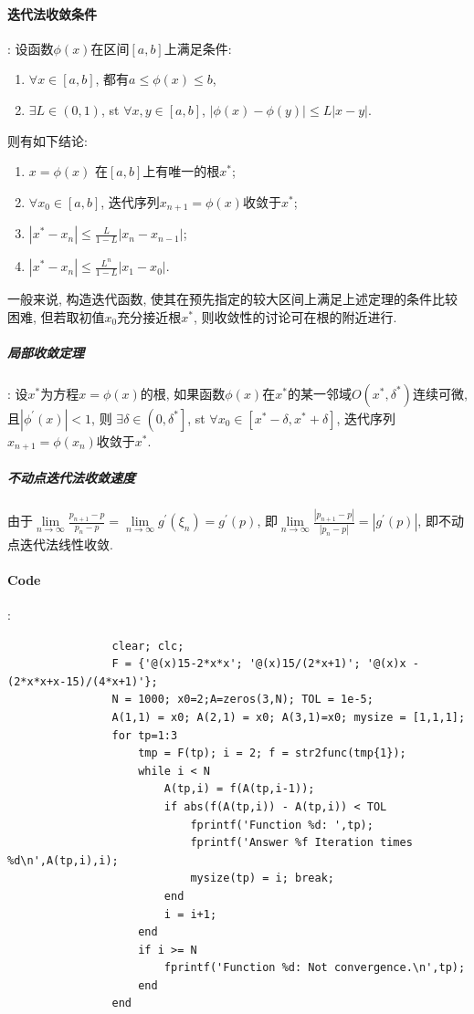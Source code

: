 \documentclass{article}
\begin{document}
\begin{CJK*}{UTF8}{song}
			\paragraph{迭代法收敛条件}:
				设函数$\phi \left( x\right)$在区间$\left[a,b\right]$上满足条件:
				\begin{enumerate}
					\item $\forall x \in \left[a,b\right]$, 都有$a \leq \phi \left(x\right) \leq b$, 
					\item $\exists L \in \left(0,1\right)$, st $\forall x,y \in \left[a,b\right]$, $\left|\phi \left(x\right) - \phi \left( y\right)\right| \leq L \left|x-y\right|$.
				\end{enumerate}
				则有如下结论:
				\begin{enumerate}
					\item $x = \phi \left(x\right) $ 在$\left[a,b\right]$上有唯一的根$x^{*}$;
					\item $\forall x_0 \in \left[a,b\right]$, 迭代序列$x_{n+1} = \phi \left(x\right)$收敛于$x^{*}$;
					\item $\left|x^{*} - x_n \right| \leq \frac{L}{1-L} \left|x_n - x_{n-1} \right|$;
					\item $\left|x^{*} - x_n \right| \leq \frac{L^n}{1-L} \left|x_1 - x_0 \right|$.
				\end{enumerate}
				一般来说, 构造迭代函数, 使其在预先指定的较大区间上满足上述定理的条件比较困难, 但若取初值$x_0$充分接近根$x^{*}$, 则收敛性的讨论可在根的附近进行.
				\subparagraph{局部收敛定理}:
					设$x^{*}$为方程$x = \phi \left(x\right)$的根, 如果函数$\phi \left(x\right)$在$x^{*}$的某一邻域$O\left(x^{*},\delta^{*}\right)$连续可微, 且$\left| \phi^{'} \left(x\right)\right| < 1$, 则
					$\exists \delta \in \left( 0,\delta^{*}  \right]$, st $\forall x_0 \in \left[x^{*} - \delta, x^{*} + \delta \right]$, 迭代序列$x_{n+1} = \phi\left(x_n\right)$收敛于$x^{*}$.
				\subparagraph{不动点迭代法收敛速度}
					由于$\lim\limits_{n \to \infty} \frac{p_{n+1}-p}{p_n - p} = \lim\limits_{n \to \infty} g^{'}\left(\xi_n \right) = g^{'}\left( p\right)$, 即$\lim\limits_{n \to \infty} \frac{\left|p_{n+1}-p\right|}{\left|p_n - p\right|} = \left|g^{'}\left(p\right)\right|$, 即不动点迭代法线性收敛.
			
			\paragraph{Code}:\newline
				\begin{lstlisting}
				clear; clc;				
				F = {'@(x)15-2*x*x'; '@(x)15/(2*x+1)'; '@(x)x - (2*x*x+x-15)/(4*x+1)'};
				N = 1000; x0=2;A=zeros(3,N); TOL = 1e-5;
				A(1,1) = x0; A(2,1) = x0; A(3,1)=x0; mysize = [1,1,1];
				for tp=1:3
					tmp = F(tp); i = 2; f = str2func(tmp{1});
					while i < N
						A(tp,i) = f(A(tp,i-1));
						if abs(f(A(tp,i)) - A(tp,i)) < TOL
							fprintf('Function %d: ',tp);
							fprintf('Answer %f Iteration times %d\n',A(tp,i),i);
							mysize(tp) = i; break;
						end
						i = i+1;
					end
					if i >= N
						fprintf('Function %d: Not convergence.\n',tp);
					end
				end
				\end{lstlisting}	
				

\end{CJK*}
\end{document}
